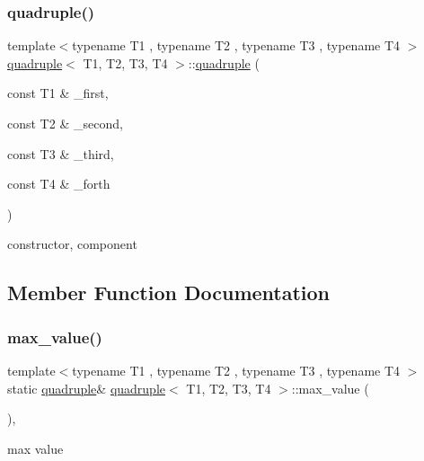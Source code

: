 \subsubsection{\texorpdfstring{quadruple()}{quadruple()}\hspace{0.1cm}{\footnotesize\ttfamily [3/3]}}
{\footnotesize\ttfamily template$<$typename T1 , typename T2 , typename T3 , typename T4 $>$ \\
\hyperlink{structquadruple}{quadruple}$<$ T1, T2, T3, T4 $>$\+::\hyperlink{structquadruple}{quadruple} (\begin{DoxyParamCaption}\item[{const T1 \&}]{\+\_\+first,  }\item[{const T2 \&}]{\+\_\+second,  }\item[{const T3 \&}]{\+\_\+third,  }\item[{const T4 \&}]{\+\_\+forth }\end{DoxyParamCaption})\hspace{0.3cm}{\ttfamily [inline]}}



constructor, component 



\subsection{Member Function Documentation}
\mbox{\label{structquadruple_a1361dd9869f7323e5fc33ab07864e128}} 
\subsubsection{\texorpdfstring{max\+\_\+value()}{max\_value()}}
{\footnotesize\ttfamily template$<$typename T1 , typename T2 , typename T3 , typename T4 $>$ \\
static \hyperlink{structquadruple}{quadruple}\& \hyperlink{structquadruple}{quadruple}$<$ T1, T2, T3, T4 $>$\+::max\+\_\+value (\begin{DoxyParamCaption}{ }\end{DoxyParamCaption})\hspace{0.3cm}{\ttfamily [inline]}, {\ttfamily [static]}}



max value 

\mbox{\label{structquadruple_a97a2767881ac4cfb52513827b4f51588}} 
